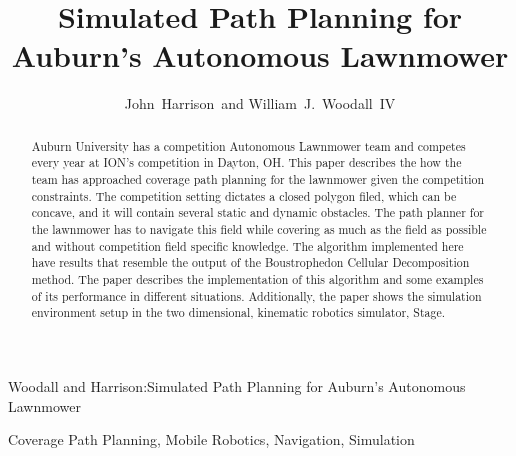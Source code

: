 \documentclass[journal]{IEEEtran}
\begin{document}
  
  \title{Simulated Path Planning for Auburn's Autonomous Lawnmower}
  
  \author{John~Harrison~and
          William~J.~Woodall~IV%
  
  }
  
  {Woodall and Harrison:Simulated Path Planning for Auburn's Autonomous Lawnmower}
  
  \maketitle
  
  \begin{abstract}
    Auburn University has a competition Autonomous Lawnmower team and competes
    every year at ION's competition\cite{IONAutomow} in Dayton, OH.  This
    paper describes the how the team has approached coverage path planning for 
    the lawnmower given the competition constraints.  The competition setting 
    dictates a closed polygon filed, which can be concave, and it will contain 
    several static and dynamic obstacles.  The path planner for the lawnmower 
    has to navigate this field while covering as much as the field as possible 
    and without competition field specific knowledge.  The algorithm 
    implemented here have results that resemble the output of the 
    Boustrophedon Cellular Decomposition\cite{Choset_1997_1416} method.  The 
    paper describes the implementation of this algorithm and some 
    examples of its performance in different situations.  Additionally, the 
    paper shows the simulation environment setup in the two dimensional, 
    kinematic robotics simulator, Stage\cite{vaughan2000stage}.
  \end{abstract}
  
  \begin{IEEEkeywords}
    Coverage Path Planning, Mobile Robotics, Navigation, Simulation
  \end{IEEEkeywords}
  
  \IEEEpeerreviewmaketitle
  
\end{document}
